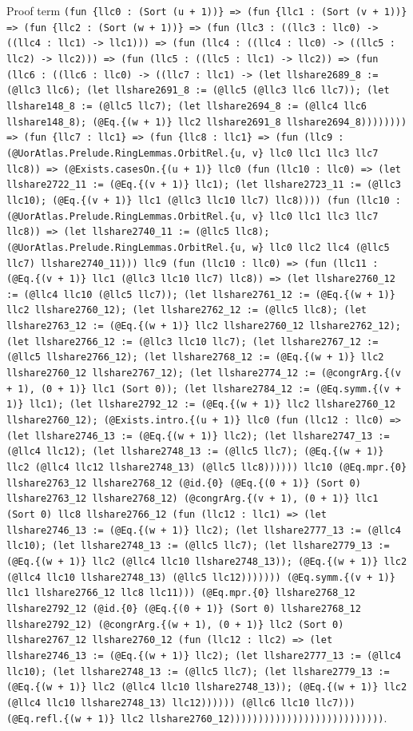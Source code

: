 \documentclass[11pt]{article}
\begin{document}
\noindent Proof term \texttt{(fun \{llc0 : (Sort (u + 1))\} => (fun \{llc1 : (Sort (v + 1))\} => (fun \{llc2 : (Sort (w + 1))\} => (fun (llc3 : ((llc3 : llc0) -> ((llc4 : llc1) -> llc1))) => (fun (llc4 : ((llc4 : llc0) -> ((llc5 : llc2) -> llc2))) => (fun (llc5 : ((llc5 : llc1) -> llc2)) => (fun (llc6 : ((llc6 : llc0) -> ((llc7 : llc1) -> (let llshare2689\_8 := (@llc3 llc6); (let llshare2691\_8 := (@llc5 (@llc3 llc6 llc7)); (let llshare148\_8 := (@llc5 llc7); (let llshare2694\_8 := (@llc4 llc6 llshare148\_8); (@Eq.\{(w + 1)\} llc2 llshare2691\_8 llshare2694\_8)))))))) => (fun \{llc7 : llc1\} => (fun \{llc8 : llc1\} => (fun (llc9 : (@UorAtlas.Prelude.RingLemmas.OrbitRel.\{u, v\} llc0 llc1 llc3 llc7 llc8)) => (@Exists.casesOn.\{(u + 1)\} llc0 (fun (llc10 : llc0) => (let llshare2722\_11 := (@Eq.\{(v + 1)\} llc1); (let llshare2723\_11 := (@llc3 llc10); (@Eq.\{(v + 1)\} llc1 (@llc3 llc10 llc7) llc8)))) (fun (llc10 : (@UorAtlas.Prelude.RingLemmas.OrbitRel.\{u, v\} llc0 llc1 llc3 llc7 llc8)) => (let llshare2740\_11 := (@llc5 llc8); (@UorAtlas.Prelude.RingLemmas.OrbitRel.\{u, w\} llc0 llc2 llc4 (@llc5 llc7) llshare2740\_11))) llc9 (fun (llc10 : llc0) => (fun (llc11 : (@Eq.\{(v + 1)\} llc1 (@llc3 llc10 llc7) llc8)) => (let llshare2760\_12 := (@llc4 llc10 (@llc5 llc7)); (let llshare2761\_12 := (@Eq.\{(w + 1)\} llc2 llshare2760\_12); (let llshare2762\_12 := (@llc5 llc8); (let llshare2763\_12 := (@Eq.\{(w + 1)\} llc2 llshare2760\_12 llshare2762\_12); (let llshare2766\_12 := (@llc3 llc10 llc7); (let llshare2767\_12 := (@llc5 llshare2766\_12); (let llshare2768\_12 := (@Eq.\{(w + 1)\} llc2 llshare2760\_12 llshare2767\_12); (let llshare2774\_12 := (@congrArg.\{(v + 1), (0 + 1)\} llc1 (Sort 0)); (let llshare2784\_12 := (@Eq.symm.\{(v + 1)\} llc1); (let llshare2792\_12 := (@Eq.\{(w + 1)\} llc2 llshare2760\_12 llshare2760\_12); (@Exists.intro.\{(u + 1)\} llc0 (fun (llc12 : llc0) => (let llshare2746\_13 := (@Eq.\{(w + 1)\} llc2); (let llshare2747\_13 := (@llc4 llc12); (let llshare2748\_13 := (@llc5 llc7); (@Eq.\{(w + 1)\} llc2 (@llc4 llc12 llshare2748\_13) (@llc5 llc8)))))) llc10 (@Eq.mpr.\{0\} llshare2763\_12 llshare2768\_12 (@id.\{0\} (@Eq.\{(0 + 1)\} (Sort 0) llshare2763\_12 llshare2768\_12) (@congrArg.\{(v + 1), (0 + 1)\} llc1 (Sort 0) llc8 llshare2766\_12 (fun (llc12 : llc1) => (let llshare2746\_13 := (@Eq.\{(w + 1)\} llc2); (let llshare2777\_13 := (@llc4 llc10); (let llshare2748\_13 := (@llc5 llc7); (let llshare2779\_13 := (@Eq.\{(w + 1)\} llc2 (@llc4 llc10 llshare2748\_13)); (@Eq.\{(w + 1)\} llc2 (@llc4 llc10 llshare2748\_13) (@llc5 llc12))))))) (@Eq.symm.\{(v + 1)\} llc1 llshare2766\_12 llc8 llc11))) (@Eq.mpr.\{0\} llshare2768\_12 llshare2792\_12 (@id.\{0\} (@Eq.\{(0 + 1)\} (Sort 0) llshare2768\_12 llshare2792\_12) (@congrArg.\{(w + 1), (0 + 1)\} llc2 (Sort 0) llshare2767\_12 llshare2760\_12 (fun (llc12 : llc2) => (let llshare2746\_13 := (@Eq.\{(w + 1)\} llc2); (let llshare2777\_13 := (@llc4 llc10); (let llshare2748\_13 := (@llc5 llc7); (let llshare2779\_13 := (@Eq.\{(w + 1)\} llc2 (@llc4 llc10 llshare2748\_13)); (@Eq.\{(w + 1)\} llc2 (@llc4 llc10 llshare2748\_13) llc12)))))) (@llc6 llc10 llc7))) (@Eq.refl.\{(w + 1)\} llc2 llshare2760\_12)))))))))))))))))))))))))))}.\par
\end{document}
